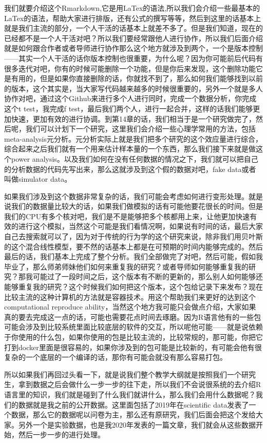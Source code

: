 \documentclass[
  oneside]{book}
\begin{document}
我们就要介绍这个Rmarkdown,它是用LaTex的语法,所以我们会介绍一些最基本的LaTex的语法，帮助大家进行排版，还有公式的撰写等等，然后到这里的话基本上就是我们主流的部分，一个人干活的话基本上就差不多了。但是我们知道，现在的已经都不是一个人干活对吧？所以我们要经常跟他人进行协作，所以我们后面介绍就是如何跟合作者或者导师进行协作那么这个地方就涉及到两个，一个是版本控制------其实一个人干活的话你版本控制也很重要，为什么呢？因为你可能前后代码有很多迭代对吧，你有的时候可能删除一个功能，但是你后来发现，这个删除功能它是有用的，但是如果你直接删除的话，你就找不到了，那么如何我们能够找到以前的版本，这个其实是，当大家写代码越来越多的时候很重要的，另外一个就是多人协作对吧，通过这个Github来进行多个人进行同时，完成一个数据分析，你完成这个t
test，我完成f
test，最后我们两个人，进行一起合并，这样的话我们能够更加快速，更加有效的进行协调。到第14章的话，我们相当于是一个研究做完了，然后呢，我们可以计划下一个研究，这里我们会介绍一些心理学常用的方法，包括meta-analysis元分析。元分析实际上就是我们把多个研究的这个效应量进行综合，综合起来之后我们就有一个用来估计样本量的一个东西，那么我们接下来就是做这个power
analysis。以及我们如何在没有任何数据的情况之下，我们就可以把自己的分析数据的代码先写出来，那么这就涉及到这个假的数据对吧，fake
data或者叫做simulator data。

如果我们涉及到这个数据非常复杂的话，我们可能会考虑如何进行变形处理。就是说我们的数据量比较大的话，如果我们做模拟的话有可能他要花很长的时间。但是我们的CPU有多个核对吧，我们是不是能够把多个核都用上来，让他更加快速有效的进行这个模拟，当然这个可能是我们看情况啊，如果说有时间的话，最后大家自己去搜索就可以了，因为对于传统的行为学的这个研究来说，除非我们用贝叶斯的这个混合线性模型，要不然的话基本上都是在可预期的时间内能够完成的。然后最后的话，我们基本上完成了整个分析。我们全部做完了对吧，然后可能，假如我毕业了，那么师弟师妹他们如何来重复我的研究？或者导师如何能够重复我的研究？那我可能过了一段时间之后，这个版本有不断的更新的，那么别人如何能够还能够重复我的研究？这个时候我们如何把这个版本，这个包给记录下来发布？现在比较主流的这种计算机的方法就是容器技术。用这个帮助我们来更好的达到这个computational
reproduce
ability，当然这个地方我可能只会做点介绍，大家如果真的要去完成这一点的话，可能也需要花点时间去琢磨。因为R语言他有的一些包可能会涉及到比较系统里面比较底层的软件的交互，所以呢他可能------就是说依赖于你使用的什么包，如果你使用的包是比较主流的，比较常规的，那可能，你把它打到docker里面是很容易的，如果你涉及到的包可能是比较新的，有可能会他有很复杂的一个底层的一个编译的话，那你有可能会就没有那么容易打包。

所以如果我们再回过头看一下，就是说我们整个教学大纲就是按照我们一个研究生，拿到数据之后会做什么一步一步的往下走，所以我们不会说很系统的去介绍R语言里的知识，我们就是碰到了什么我们就讲什么，那么我们会用什么数据呢？我们的数据就是我之前的公开数据。这里面包括了2019年在scientific
data发表了一个数据，那么它的数据呢以问卷为主，那么还有原研究，我们后面会把这个发给大家。另外一个是实验数据，也是我2020年发表的一篇文章，我们就会从这些数据开始，然后一步一步的进行处理。
\end{document}
